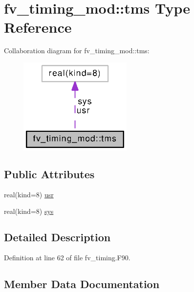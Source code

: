 \section{fv\-\_\-timing\-\_\-mod\-:\-:tms Type Reference}
\label{structfv__timing__mod_1_1tms}


Collaboration diagram for fv\-\_\-timing\-\_\-mod\-:\-:tms\-:
\nopagebreak
\begin{figure}[H]
\begin{center}
\leavevmode
\includegraphics[width=158pt]{structfv__timing__mod_1_1tms__coll__graph}
\end{center}
\end{figure}
\subsection*{Public Attributes}
\begin{DoxyCompactItemize}
\item 
real(kind=8) \hyperlink{structfv__timing__mod_1_1tms_ab3e73d47d65260a7e032e6800def553d}{usr}
\item 
real(kind=8) \hyperlink{structfv__timing__mod_1_1tms_a59dd213f4d775f1dec2c09b15eac0f07}{sys}
\end{DoxyCompactItemize}


\subsection{Detailed Description}


Definition at line 62 of file fv\-\_\-timing.\-F90.



\subsection{Member Data Documentation}
